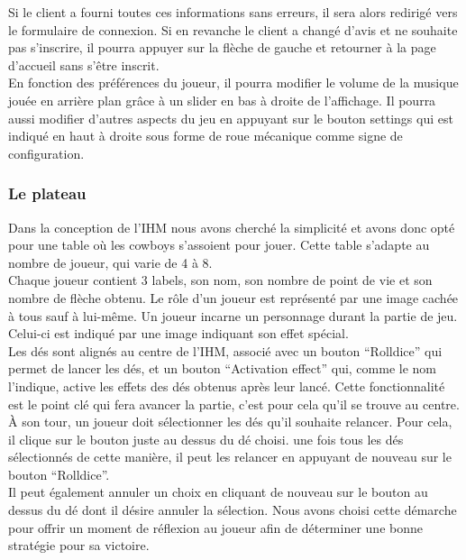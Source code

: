 \documentclass[a4paper,11pt]{article}
\begin{document}
\newpage 

    Si le client a fourni toutes ces informations sans erreurs, il sera alors redirigé vers le formulaire de connexion. Si en revanche le client a changé d’avis et ne souhaite pas s’inscrire, il pourra appuyer sur la flèche de gauche et retourner à la page d’accueil sans s'être inscrit. \\

    En fonction des préférences du joueur, il pourra modifier le volume de la musique jouée en arrière plan grâce à un slider en bas à droite de l’affichage. Il pourra aussi modifier d’autres aspects du jeu en appuyant sur le bouton settings qui est indiqué en haut à droite sous forme de roue mécanique comme signe de configuration.

\subsubsection{Le plateau}

    Dans la conception de l'IHM nous avons cherché la simplicité et avons donc opté pour une table où les cowboys s’assoient pour jouer. Cette table s'adapte au nombre de joueur, qui varie de 4 à 8. \\

    Chaque joueur contient 3 labels, son nom, son nombre de point de vie et son nombre de flèche obtenu. Le rôle d’un joueur est représenté par une image cachée à tous sauf à lui-même. Un joueur incarne un personnage durant la partie de jeu. Celui-ci est indiqué par une image indiquant son effet spécial. \\

    Les dés sont alignés au centre de l'IHM, associé avec un bouton “Rolldice” qui permet de lancer les dés, et un bouton “Activation effect” qui, comme le nom l'indique, active les effets des dés obtenus après leur lancé. Cette fonctionnalité est le point clé qui fera avancer la partie, c’est pour cela qu’il se trouve au centre. \\

    À son tour, un joueur doit sélectionner les dés qu'il souhaite relancer. Pour cela, il clique sur le bouton juste au dessus du dé choisi. une fois tous les dés sélectionnés de cette manière, il peut les relancer en appuyant de nouveau sur le bouton “Rolldice”. \\

    Il peut également annuler un choix en cliquant de nouveau sur le bouton au dessus du dé dont il désire annuler la sélection. Nous avons choisi cette démarche pour offrir un moment de réflexion au joueur afin de déterminer une bonne stratégie pour sa victoire. \\
\end{document}
